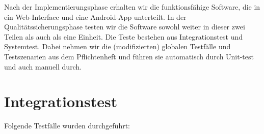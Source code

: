 \documentclass[a4paper]{scrreprt}
\begin{document}
        Nach der Implementierungsphase erhalten wir die funktionsf\"ahige Software, die in ein Web-Interface und eine Android-App unterteilt. In der Qualit\"atssicherungsphase testen wir die Software sowohl weiter in dieser zwei Teilen als auch als eine Einheit. Die Teste bestehen aus Integrationstest und Systemtest. Dabei nehmen wir die (modifizierten) globalen Testf\"alle und Testszenarien aus dem Pflichtenheft und f\"uhren sie automatisch durch Unit-test und auch manuell durch.


			
                
      \newpage
      \chapter{Integrationstest}
      Folgende Testf\"alle wurden durchgef\"uhrt:
      
      
\end{document}
